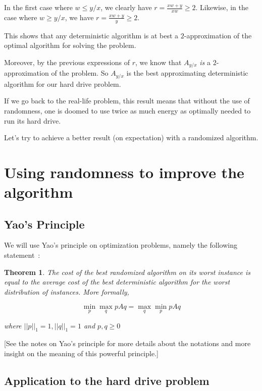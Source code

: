 \documentclass[a4paper,11pt]{article}
\newtheorem{theorem}{Theorem}
\begin{document}
In the first case where $w \leq y/x$, we clearly have $r = \frac{x w + y}{x w} \geq 2$. Likewise, in the case where $w \geq y/x$, we have $r = \frac{x w + y}{y} \geq 2$.

This shows that any deterministic algorithm is at best a $2$-approximation of the optimal algorithm for solving the problem.

\smallskip

Moreover, by the previous expressions of $r$, we know that $A_{y/x}$ \emph{is} a $2$-approximation of the problem. So $A_{y/x}$ is the best approximating deterministic algorithm for our hard drive problem.

\medskip

If we go back to the real-life problem, this result means that without the use of randomness, one is doomed to use twice as much energy as optimally needed to run its hard drive.

Let's try to achieve a better result (on expectation) with a randomized algorithm.



\section{Using randomness to improve the algorithm}

\subsection{Yao's Principle}

We will use Yao's principle on optimization problems, namely the following statement~:

\begin{theorem}
The cost of the best randomized algorithm on its worst instance is equal to the average cost of the best deterministic algorithm for the worst distribution of instances. More formally, 

\[ \min_p \max_q p A q = \max_q \min_p p A q\]

where $||p||_1=1, ||q||_1=1$ and $p,q \geq 0$
\end{theorem}

[See the notes on Yao's principle for more details about the notations and more insight on the meaning of this powerful principle.]


\subsection{Application to the hard drive problem}
\end{document}
